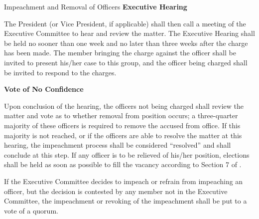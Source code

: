 {\begin{article}{Impeachment and Removal of Officers}
	\hypertarget{Executive Hearing}{}
	\textbf{Executive Hearing}

	The President (or Vice President, if applicable) shall then call a meeting of the Executive Committee to hear and review the matter. The Executive Hearing shall be held no sooner than one week and no later than three weeks after the charge has been made. The member bringing the charge against the officer shall be invited to present his/her case to this group, and the officer being charged shall be invited to respond to the charges.

	\hypertarget{Vote of No Confidence}{}
	\textbf{Vote of No Confidence}

	Upon conclusion of the hearing, the officers not being charged shall review the matter and vote as to whether removal from position occurs; a three-quarter majority of these officers is required to remove the accused from office. If this majority is not reached, or if the officers are able to resolve the matter at this hearing, the impeachment process shall be considered \enquote{resolved} and shall conclude at this step. If any officer is to be relieved of his/her position, elections shall be held as soon as possible to fill the vacancy according to Section 7 of .
	
	\item If the Executive Committee decides to impeach or refrain from impeaching an officer, but the decision is contested by any member not in the Executive Committee, the impeachment or revoking of the impeachment shall be put to a vote of a quorum.
\end{article}
}